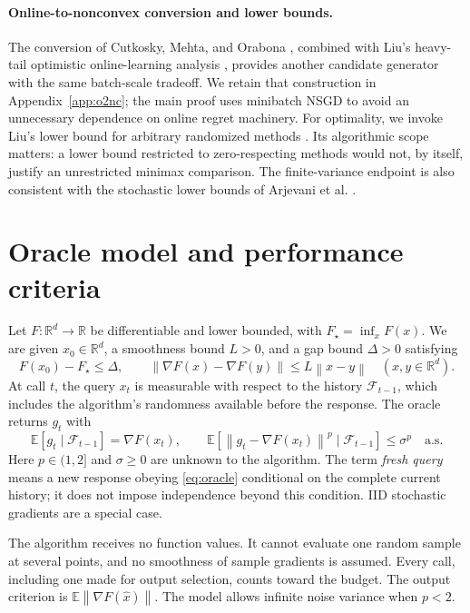 \documentclass[11pt,a4paper]{article}
\newcommand{\R}{\mathbb{R}}
\newcommand{\E}{\mathbb{E}}
\newcommand{\cF}{\mathcal{F}}
\newcommand{\norm}[1]{\left\lVert #1\right\rVert}
\theoremstyle{definition}
\theoremstyle{remark}
\begin{document}
\paragraph{Online-to-nonconvex conversion and lower bounds.}
The conversion of Cutkosky, Mehta, and Orabona
\cite{cutkosky2023o2nc}, combined with Liu's heavy-tail optimistic
online-learning analysis \cite{liu2026oco}, provides another candidate
generator with the same batch-scale tradeoff. We retain that construction
in Appendix~\ref{app:o2nc}; the main proof uses minibatch NSGD to avoid
an unnecessary dependence on online regret machinery.
For optimality, we invoke Liu's lower bound for arbitrary randomized
methods \cite[Theorem~11]{liu2026oco}. Its algorithmic scope matters:
a lower bound restricted to zero-respecting methods would not, by itself,
justify an unrestricted minimax comparison. The finite-variance endpoint
is also consistent with the stochastic lower bounds of Arjevani et al.
\cite{arjevani2023lower}.

\section{Oracle model and performance criteria}\label{sec:model}

Let $F:\R^d\to\R$ be differentiable and lower bounded, with
$F_\star=\inf_xF(x)$. We are given $x_0\in\R^d$, a smoothness bound
$L>0$, and a gap bound $\Delta>0$ satisfying
\begin{equation}\label{eq:objective}
 F(x_0)-F_\star\le\Delta,\qquad
 \norm{\nabla F(x)-\nabla F(y)}\le L\norm{x-y}
 \quad(x,y\in\R^d).
\end{equation}
At call $t$, the query $x_t$ is measurable with respect to the history
$\cF_{t-1}$, which includes the algorithm's randomness available before
the response. The oracle returns $g_t$ with
\begin{equation}\label{eq:oracle}
 \E[g_t\mid\cF_{t-1}]=\nabla F(x_t),\qquad
 \E[\norm{g_t-\nabla F(x_t)}^p\mid\cF_{t-1}]\le\sigma^p
 \quad\text{a.s.}
\end{equation}
Here $p\in(1,2]$ and $\sigma\ge0$ are unknown to the algorithm.
The term \emph{fresh query} means a new response obeying
\eqref{eq:oracle} conditional on the complete current history; it does
not impose independence beyond this condition. IID stochastic gradients
are a special case.

The algorithm receives no function values. It cannot evaluate one random
sample at several points, and no smoothness of sample gradients is assumed.
Every call, including one made for output selection, counts toward the
budget. The output criterion is $\E\norm{\nabla F(\widehat x)}$.
The model allows infinite noise variance when $p<2$.
\end{document}
